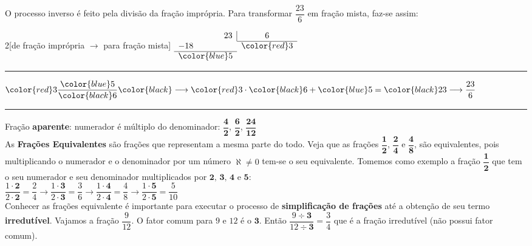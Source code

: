  	O processo inverso é feito pela divisão da fração imprópria. Para transformar $ \dfrac{23}{6} $ em fração mista, faz-se assim: \\
 	
 	\begin{multicols}{2}[de fração imprópria $ \longrightarrow $ para fração mista]
	\setlength{\columnseprule}{.5pt}
 	$
 	\begin{array}{l l r r}
 	\multicolumn{2}{r}{23} \vline & \multicolumn{2}{c}{6} \\ \cline{3-4}
 	\multicolumn{2}{l}{-18} & \multicolumn{2}{l}{\color{red}3} \\ \cline{1-2}
 	\multicolumn{2}{r}{\color{blue}5} &  \\
 	\end{array}
 	$ 	
	\hrule
 	\columnbreak
	$
	\color{red}3 \dfrac{\color{blue}5}{\color{black}6} \color{black} \longrightarrow \color{red}3 \cdot \color{black}6 + \color{blue}5 = \color{black}23 \longrightarrow \dfrac{23}{6}
	$
	\newline
	\newline
	\hrule 
 \end{multicols}


\indent Fração \textbf{aparente}: numerador é múltiplo do denominador: $\dfrac{\textbf{4}}{\textbf{2}}$, $\dfrac{\textbf{6}}{\textbf{2}}$, $\dfrac{\textbf{24}}{\textbf{12}}$ \\
	 	
 	As \textbf{Frações Equivalentes} são frações que representam a mesma parte do todo. Veja que as frações $\dfrac{\textbf{1}}{\textbf{2}}$, $\dfrac{\textbf{2}}{\textbf{4}}$ e $\dfrac{\textbf{4}}{\textbf{8}}$, são equivalentes, pois multiplicando o numerador e o denominador por um número \textbf{$\aleph \neq 0$} tem-se o seu equivalente. Tomemos como exemplo a fração $\dfrac{\textbf{1}}{\textbf{2}}$ que tem o seu numerador e seu denominador multiplicados por $\textbf{2, 3, 4}$ e $\textbf{5}$: \\
 	
 	$\dfrac{1\cdot\textbf{2}}{2\cdot\textbf{2}} = \dfrac{2}{4} \longrightarrow \dfrac{1\cdot\textbf{3}}{2\cdot\textbf{3}} = \dfrac{3}{6} \longrightarrow \dfrac{1\cdot\textbf{4}}{2\cdot\textbf{4}} = \dfrac{4}{8} \longrightarrow \dfrac{1\cdot\textbf{5}}{2\cdot\textbf{5}} = \dfrac{5}{10}$ \\
 	
 	Conhecer as frações equivalente é importante para executar o processo de \textbf{simplificação de frações} até a obtenção de seu termo \textbf{irredutível}. Vajamos a fração $\dfrac{9}{12}$. O fator comum para $9$ e $12$ é o $\textbf{3}$. Então $\dfrac{9\div\textbf{3}}{12\div\textbf{3}} = \dfrac{3}{4}$ que é a fração irredutível (não possui fator comum). \\
 	
